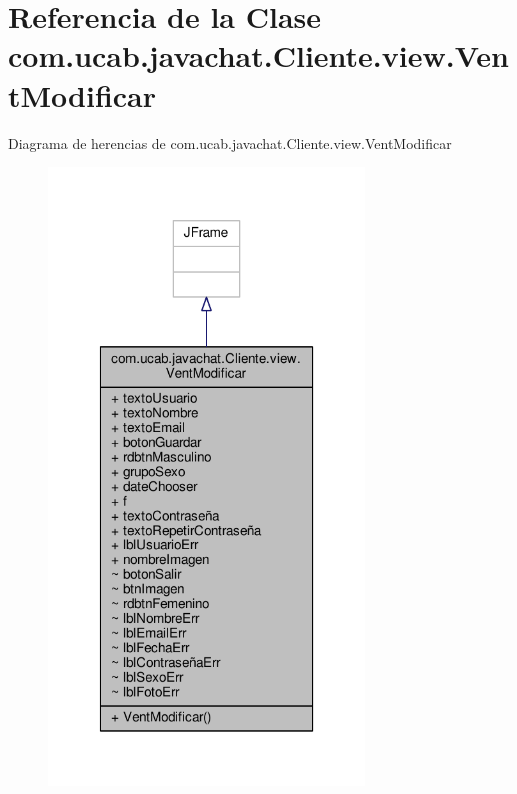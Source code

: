 \hypertarget{classcom_1_1ucab_1_1javachat_1_1_cliente_1_1view_1_1_vent_modificar}{\section{Referencia de la Clase com.\-ucab.\-javachat.\-Cliente.\-view.\-Vent\-Modificar}
\label{classcom_1_1ucab_1_1javachat_1_1_cliente_1_1view_1_1_vent_modificar}
}


Diagrama de herencias de com.\-ucab.\-javachat.\-Cliente.\-view.\-Vent\-Modificar\nopagebreak
\begin{figure}[H]
\begin{center}
\leavevmode
\includegraphics[width=238pt]{classcom_1_1ucab_1_1javachat_1_1_cliente_1_1view_1_1_vent_modificar__inherit__graph}
\end{center}
\end{figure}


